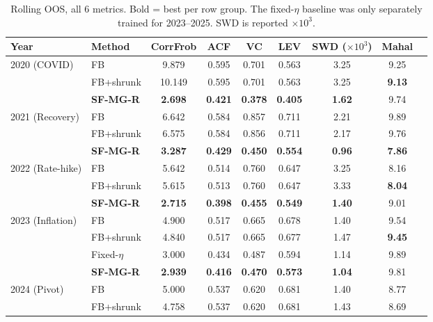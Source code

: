 \begin{table}[h]
\centering
\caption{Rolling OOS, all 6 metrics. Bold = best per row group. The fixed-$\eta$ baseline was only separately trained for 2023--2025. SWD is reported $\times 10^3$.}
\label{tab:rolling_full}
\footnotesize
\begin{tabular}{llccccccc}
\toprule
Year & Method & CorrFrob & ACF & VC & LEV & SWD ($\times 10^3$) & Mahal \\
\midrule
\multirow{3}{*}{2020 (COVID)} & FB & 9.879 & 0.595 & 0.701 & 0.563 & 3.25 & 9.25 \\
                      & FB+shrunk & 10.149 & 0.595 & 0.701 & 0.563 & 3.25 & \textbf{9.13} \\
                      & \textbf{SF-MG-R} & \textbf{2.698} & \textbf{0.421} & \textbf{0.378} & \textbf{0.405} & \textbf{1.62} & 9.74 \\
\midrule
\multirow{3}{*}{2021 (Recovery)} & FB & 6.642 & 0.584 & 0.857 & 0.711 & 2.21 & 9.89 \\
                      & FB+shrunk & 6.575 & 0.584 & 0.856 & 0.711 & 2.17 & 9.76 \\
                      & \textbf{SF-MG-R} & \textbf{3.287} & \textbf{0.429} & \textbf{0.450} & \textbf{0.554} & \textbf{0.96} & \textbf{7.86} \\
\midrule
\multirow{3}{*}{2022 (Rate-hike)} & FB & 5.642 & 0.514 & 0.760 & 0.647 & 3.25 & 8.16 \\
                      & FB+shrunk & 5.615 & 0.513 & 0.760 & 0.647 & 3.33 & \textbf{8.04} \\
                      & \textbf{SF-MG-R} & \textbf{2.715} & \textbf{0.398} & \textbf{0.455} & \textbf{0.549} & \textbf{1.40} & 9.01 \\
\midrule
\multirow{4}{*}{2023 (Inflation)} & FB & 4.900 & 0.517 & 0.665 & 0.678 & 1.40 & 9.54 \\
                      & FB+shrunk & 4.840 & 0.517 & 0.665 & 0.677 & 1.47 & \textbf{9.45} \\
                      & Fixed-$\eta$ & 3.000 & 0.434 & 0.487 & 0.594 & 1.14 & 9.89 \\
                      & \textbf{SF-MG-R} & \textbf{2.939} & \textbf{0.416} & \textbf{0.470} & \textbf{0.573} & \textbf{1.04} & 9.81 \\
\midrule
\multirow{4}{*}{2024 (Pivot)} & FB & 5.000 & 0.537 & 0.620 & 0.681 & 1.40 & 8.77 \\
                      & FB+shrunk & 4.758 & 0.537 & 0.620 & 0.681 & 1.43 & 8.69 \\

\end{tabular}
\end{table}
